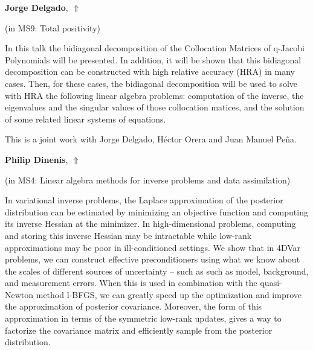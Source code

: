 \documentclass[ILAS2025-program.tex]{subfiles}
\begin{document}
\hypertarget{down0043}{}\begin{ilasabstract}
    
\textbf{Jorge Delgado},  \hfill \hyperlink{up0043}{$\Uparrow$}
    
    
(in {\color{mstitle}MS9: Total positivity})
        
\mtskip
    In this talk the bidiagonal decomposition of the Collocation Matrices of q-Jacobi Polynomials will be presented.
In addition, it will be shown that this bidiagonal decomposition can be constructed with high relative accuracy (HRA)
in many cases.
Then, for these cases, the bidiagonal decomposition will be used to solve with HRA the following linear algebra
problems: computation of the inverse, the eigenvalues and the singular values of those collocation matices, and
the solution of some related linear systems of equations.

This is a joint work with Jorge Delgado, Héctor Orera and Juan Manuel Peña.
\end{ilasabstract}
    

\hypertarget{down0357}{}\begin{ilasabstract}
    
\textbf{Philip Dinenis},  \hfill \hyperlink{up0357}{$\Uparrow$}
    
    
(in {\color{mstitle}MS4: Linear algebra methods for inverse problems and data assimilation})
        
\mtskip
    In variational inverse problems, the Laplace approximation of the posterior distribution can be estimated by minimizing an objective function and computing its inverse Hessian at the minimizer. In high-dimensional problems, computing and storing this inverse Hessian may be intractable while low-rank approximations may be poor in ill-conditioned settings. We show that in 4DVar problems, we can construct effective preconditioners using what we know about the scales of different sources of uncertainty – such as such as model, background, and measurement errors. When this is used in combination with the quasi-Newton method l-BFGS, we can greatly speed up the optimization and improve the approximation of posterior covariance. Moreover, the form of this approximation in terms of the symmetric low-rank updates, gives a way to factorize the covariance matrix and efficiently sample from the posterior distribution.

\end{ilasabstract}
    
\end{document}
